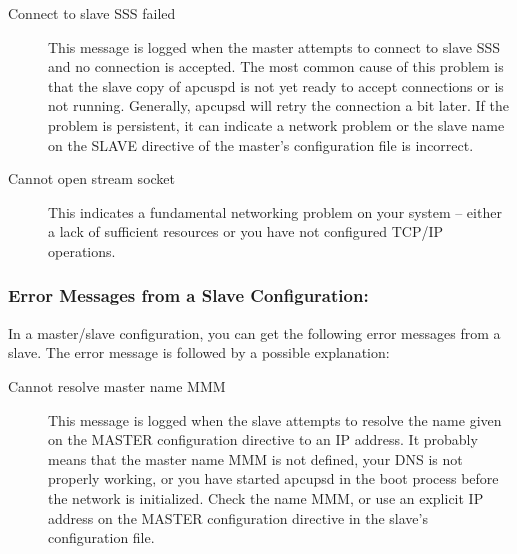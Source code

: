 {{{{{{{{\begin{description}
\item[Connect to slave SSS failed]
   \label{Connect-to-slave-SSS-failed}
This message is logged when the master attempts to connect to slave SSS and no
connection is accepted. The most common cause of this problem is that the
slave copy of apcuspd is not yet ready to accept connections or is not
running. Generally, apcupsd will retry the connection a bit later. If the
problem is persistent, it can indicate a network problem or the slave name on
the SLAVE directive of the master's configuration file is incorrect. 

\item[Cannot open stream socket]
   \label{Cannot-open-stream-socket}
This indicates a fundamental networking problem on your system {--} either a
lack of sufficient resources or you have not configured TCP/IP operations. 
\end{description}

\label{Error-Messages-from-a-Slave-Configuration}
\subsubsection*{Error Messages from a Slave Configuration:}

In a master/slave configuration, you can get the following error messages from
a slave. The error message is followed by a possible explanation: 

\begin{description}
\item[Cannot resolve master name MMM]
   \label{Cannot-resolve-master-name-MMM}
This message is logged when the slave attempts to resolve the name given on
the MASTER configuration directive to an IP address. It probably means that
the master name MMM is not defined, your DNS is not properly working, or you
have started apcupsd in the boot process before the network is initialized.
Check the name MMM, or use an explicit IP address on the MASTER configuration
directive in the slave's configuration file. 


\end{description}}}}}}}}}
